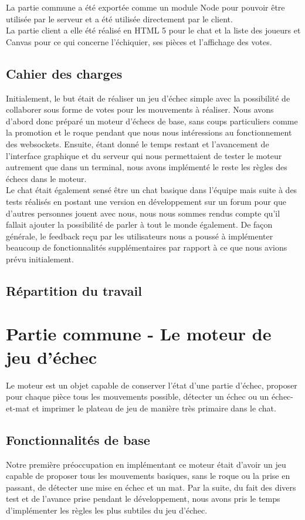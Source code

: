 \documentclass{article}
\begin{document}
La partie commune a été exportée comme un module Node pour pouvoir être utilisée par le serveur et a été utilisée directement par le client. \\

La partie client a elle été réalisé en HTML 5 pour le chat et la liste des joueurs et Canvas pour ce qui concerne l'échiquier, ses pièces et l'affichage des votes.
\subsection{Cahier des charges}
Initialement, le but était de réaliser un jeu d'échec simple avec la possibilité de collaborer sous forme de votes pour les mouvements à réaliser. Nous avons d'abord donc préparé un moteur d'échecs de base, sans coups particuliers comme la promotion et le roque pendant que nous nous intéressions au fonctionnement des websockets. Ensuite, étant donné le temps restant et l'avancement de l'interface graphique et du serveur qui nous permettaient de tester le moteur autrement que dans un terminal, nous avons implémenté le reste les règles des échecs dans le moteur. \\

Le chat était également sensé être un chat basique dans l'équipe mais suite à des tests réalisés en postant une version en développement sur un forum pour que d'autres personnes jouent avec nous, nous nous sommes rendus compte qu'il fallait ajouter la possibilité de parler à tout le monde également. De façon générale, le feedback reçu par les utilisateurs nous a poussé à implémenter beaucoup de fonctionnalités supplémentaires par rapport à ce que nous avions prévu initialement.
\subsection{Répartition du travail}
\section{Partie commune - Le moteur de jeu d'échec}
Le moteur est un objet capable de conserver l'état d'une partie d'échec, proposer pour chaque pièce tous les mouvements possible, détecter un échec ou un échec-et-mat et imprimer le plateau de jeu de manière très primaire dans le chat.
\subsection{Fonctionnalités de base}
Notre première préoccupation en implémentant ce moteur était d'avoir un jeu capable de proposer tous les mouvements basiques, sans le roque ou la prise en passant, de détecter une mise en échec et un mat. Par la suite, du fait des divers test et de l'avance prise pendant le développement, nous avons pris le temps d'implémenter les règles les plus subtiles du jeu d'échec.\\
\end{document}
